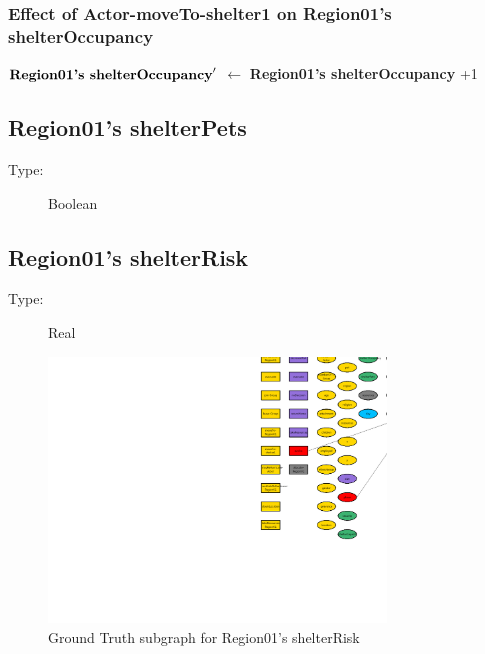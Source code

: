 \documentclass{article}%
\begin{document}
%
\subsubsection{Effect of Actor{-}moveTo{-}shelter1 on Region01's shelterOccupancy}%
\label{ssubsec:Effect of Actor{-}moveTo{-}shelter1 on Region01's shelterOccupancy}%
\begin{flushleft}%
$\mbox{\textbf{Region01's shelterOccupancy}} '$%
$\leftarrow$%
\textbf{Region01's shelterOccupancy}%
+1%
\end{flushleft}

%
\subsection{Region01's shelterPets}%
\label{subsec:Region01's shelterPets}%
\begin{description}%
\item[Type:]%
Boolean%
\end{description}

%
\subsection{Region01's shelterRisk}%
\label{subsec:Region01's shelterRisk}%
\begin{description}%
\item[Type:]%
Real%
\end{description}%


\begin{figure}[ht]%
\centering%
\includegraphics[width=0.8\textwidth]{images/shelterRiskOfRegion01.png}%
\caption{Ground Truth subgraph for Region01's shelterRisk}%
\end{figure}
\end{document}

